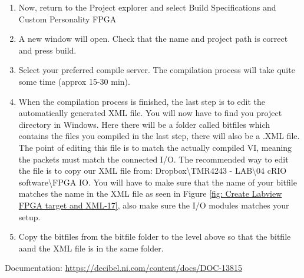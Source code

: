 \documentclass[a4paper,english]{report}
\begin{document}
\begin{enumerate}
	\item Now, return to the Project explorer and select Build Specifications and Custom Personality FPGA
	\item A new window will open. Check that the name and project path is correct and press build.
	\item Select your preferred compile server. The compilation process will take quite some time (approx 15-30 min).
	\item When the compilation process is finished, the last step is to edit the automatically generated XML file. You will now have to find you project directory in Windows. Here there will be a folder called bitfiles which contains the files you compiled in the last step, there will also be a .XML file. The point of editing this file is to match the actually compiled VI, meaning the packets must match the connected I/O. The recommended way to edit the file is to copy our XML file from: Dropbox\textbackslash{}TMR4243 - LAB\textbackslash{}04 cRIO software\textbackslash{}FPGA IO. You will have to make sure that the name of your bitfile matches the name in the XML file as seen in Figure \ref{fig: Create Labview FPGA target and XML-17}, also make sure the I/O modules matches your setup.
	\item Copy the bitfiles from the bitfile folder to the level above so that the bitfile aand the XML file is in the same folder.
\end{enumerate}
Documentation: \url{https://decibel.ni.com/content/docs/DOC-13815}
\end{document}
